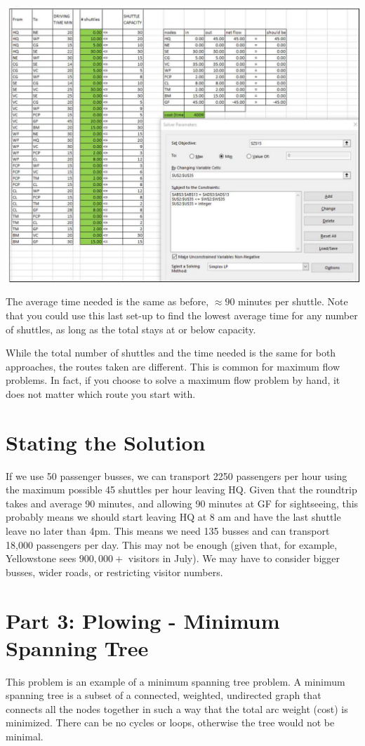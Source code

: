 \documentclass[10pt]{article}
\begin{document}
\includegraphics[max width=\textwidth]{2022_07_05_5945264bba2a5f6ba667g-51}

The average time needed is the same as before, $\approx 90$ minutes per shuttle. Note that you could use this last set-up to find the lowest average time for any number of shuttles, as long as the total stays at or below capacity.

While the total number of shuttles and the time needed is the same for both approaches, the routes taken are different. This is common for maximum flow problems. In fact, if you choose to solve a maximum flow problem by hand, it does not matter which route you start with.

\section{Stating the Solution}
If we use 50 passenger busses, we can transport 2250 passengers per hour using the maximum possible 45 shuttles per hour leaving HQ. Given that the roundtrip takes and average 90 minutes, and allowing 90 minutes at GF for sightseeing, this probably means we should start leaving $\mathrm{HQ}$ at 8 am and have the last shuttle leave no later than 4pm. This means we need 135 busses and can transport 18,000 passengers per day. This may not be enough (given that, for example, Yellowstone sees $900,000+$ visitors in July). We may have to consider bigger busses, wider roads, or restricting visitor numbers.

\section{Part 3: Plowing - Minimum Spanning Tree}
This problem is an example of a minimum spanning tree problem. A minimum spanning tree is a subset of a connected, weighted, undirected graph that connects all the nodes together in such a way that the total arc weight (cost) is minimized. There can be no cycles or loops, otherwise the tree would not be minimal.
\end{document}
